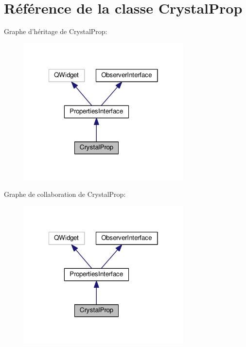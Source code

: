 \hypertarget{classCrystalProp}{\section{Référence de la classe Crystal\+Prop}
\label{classCrystalProp}
}


Graphe d'héritage de Crystal\+Prop\+:
\nopagebreak
\begin{figure}[H]
\begin{center}
\leavevmode
\includegraphics[width=247pt]{d8/d57/classCrystalProp__inherit__graph}
\end{center}
\end{figure}


Graphe de collaboration de Crystal\+Prop\+:
\nopagebreak
\begin{figure}[H]
\begin{center}
\leavevmode
\includegraphics[width=247pt]{d0/d15/classCrystalProp__coll__graph}
\end{center}
\end{figure}
